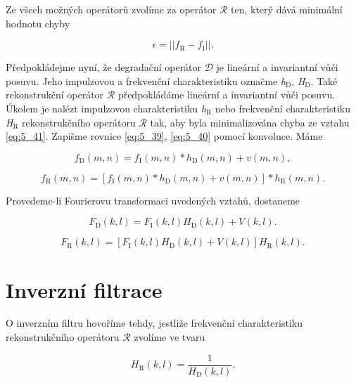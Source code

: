 Ze všech možných operátorů zvolíme za operátor $\mathscr{R}$ ten, který dává minimální hodnotu chyby

\begin{equation} \label{eq:5_41}
    \epsilon = || f_\mathrm{R} - f_\mathrm{I} ||.
\end{equation}

Předpokládejme nyní, že degradační operátor $\mathscr{D}$ je lineární a invariantní vůči posuvu. Jeho impulzovou a frekvenční charakteristiku označme \textit{h}$_\mathrm{D}$, \textit{H}$_\mathrm{D}$. Také rekonstrukční operátor $\mathscr{R}$ předpokládáme lineární a invariantní vůči posuvu. Úkolem je nalézt impulzovou charakteristiku \textit{h}$_\mathrm{R}$ nebo frekvenční charakteristiku \textit{H}$_\mathrm{R}$ rekonstrukčního operátoru $\mathscr{R}$ tak, aby byla minimalizována chyba ze vztahu \eqref{eq:5_41}. Zapišme rovnice \eqref{eq:5_39}, \eqref{eq:5_40} pomocí konvoluce. Máme

\begin{equation} \label{eq:5_42}
    f_\mathrm{D} (m, n) = f_\mathrm{I} (m, n) * h_\mathrm{D} (m, n) + v(m, n),
\end{equation}

\begin{equation} \label{eq:5_43}
    f_\mathrm{R} (m, n) = \left[ f_\mathrm{I} (m, n) * h_\mathrm{D} (m, n) + v(m, n) \right] * h_\mathrm{R}(m, n).
\end{equation}

Provedeme-li Fourierovu transformaci uvedených vztahů, dostaneme

\begin{equation} \label{eq:5_44}
    F_\mathrm{D} (k, l) = F_\mathrm{I} (k, l) H_\mathrm{D} (k, l) + V(k, l).
\end{equation}

\begin{equation} \label{eq:5_45}
    F_\mathrm{R} (k, l) = \left[ F_\mathrm{I} (k, l) H_\mathrm{D} (k, l) + V(k, l) \right] H_\mathrm{R}(k, l).
\end{equation}

\section*{Inverzní filtrace}

O inverzním filtru hovoříme tehdy, jestliže frekvenční charakteristiku rekonstrukčního operátoru $\mathscr{R}$ zvolíme ve tvaru

\begin{equation} \label{eq:5_46}
    H_\mathrm{R} (k, l) = \frac{1}{H_\mathrm{D} (k, l)}.
\end{equation}

